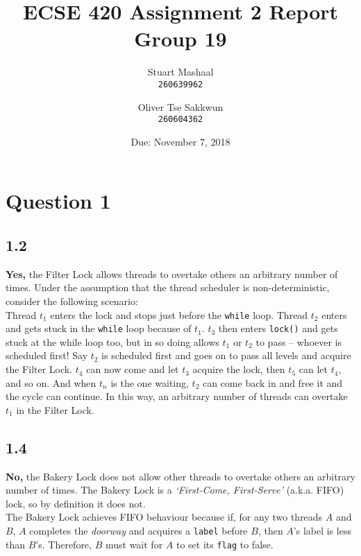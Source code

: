 \documentclass[11pt, letterpaper]{article}
\title{ECSE 420 Assignment 2 Report\\Group 19}
\author{
    Stuart Mashaal\\
    \texttt{260639962}
    \and
    Oliver Tse Sakkwun\\
    \texttt{260604362}
}
\date{Due: November 7, 2018}
\newcommand{\code}[1] { \texttt{#1} }
\begin{document}
\begin{titlepage}
    \maketitle
    \thispagestyle{empty}
    \setcounter{page}{0}
\end{titlepage}

\section*{Question 1}
\label{sec:question_1}

\subsection*{1.2}
\label{sub:1_2}

\textbf{Yes,} the Filter Lock allows threads to overtake others an arbitrary number of times. Under the assumption that the thread scheduler is non-deterministic, consider the following scenario:\\

Thread $t_1$ enters the lock and stops just before the \code{while} loop. Thread $t_2$ enters and gets stuck in the \code{while} loop because of $t_1$. $t_3$ then enters \code{lock()} and gets stuck at the while loop too, but in so doing allows $t_1$ or $t_2$ to pass -- whoever is scheduled first! Say $t_2$ is scheduled first and goes on to pass all levels and acquire the Filter Lock. $t_4$ can now come and let $t_3$ acquire the lock, then $t_5$ can let $t_4$, and so on. And when $t_n$ is the one waiting, $t_2$ can come back in and free it and the cycle can continue. In this way, an arbitrary number of threads can overtake $t_1$ in the Filter Lock.

\subsection*{1.4}
\label{sub:1_4}

\textbf{No,} the Bakery Lock does not allow other threads to overtake others an arbitrary number of times. The Bakery Lock is a \textit{`First-Come, First-Serve'} (a.k.a. FIFO) lock, so by definition it does not.\\

The Bakery Lock achieves FIFO behaviour because if, for any two threads $A$ and $B$, $A$ completes the \textit{doorway} and acquires a \code{label} before $B$, then $A$'s label is less than $B$'s. Therefore, $B$ must wait for $A$ to set its \code{flag} to false.\\
\end{document}
